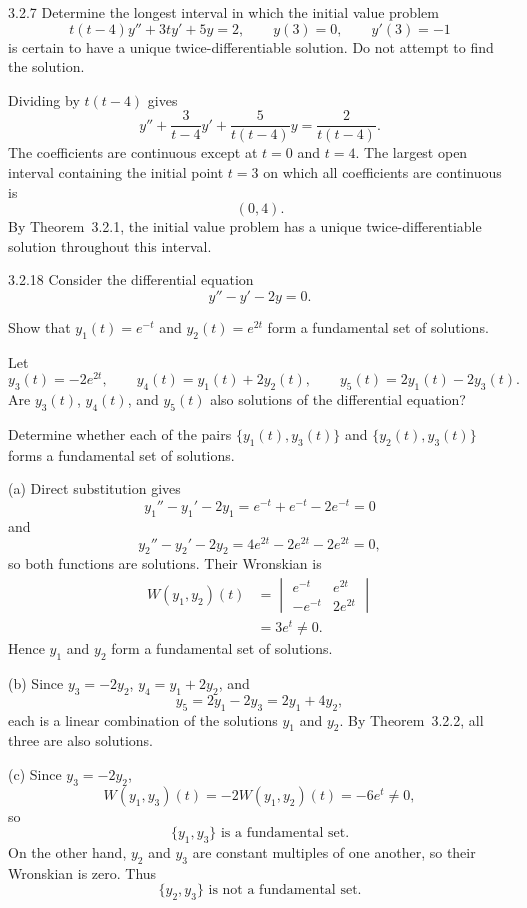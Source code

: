 \documentclass[11pt,oneside]{article}
\begin{document}
\begin{problem}{3.2.7}
Determine the longest interval in which the initial value problem
\[
    t(t-4)y''+3ty'+5y=2,
    \qquad
    y(3)=0,
    \qquad
    y'(3)=-1
\]
is certain to have a unique twice-differentiable solution. Do not attempt to find the solution.
\end{problem}

\begin{solution}
Dividing by $t(t-4)$ gives
\[
    y''+\frac{3}{t-4}y'
    +\frac{5}{t(t-4)}y
    =\frac{2}{t(t-4)}.
\]
The coefficients are continuous except at $t=0$ and $t=4$. The largest open interval containing the initial point $t=3$ on which all coefficients are continuous is
\[
    \boxed{(0,4)}.
\]
By Theorem~3.2.1, the initial value problem has a unique twice-differentiable solution throughout this interval.
\end{solution}

\begin{problem}{3.2.18}
Consider the differential equation
\[
    y''-y'-2y=0.
\]
\begin{problemsubparts}
    \item Show that $y_1(t)=e^{-t}$ and $y_2(t)=e^{2t}$ form a fundamental set of solutions.
    \item Let
    \[
        y_3(t)=-2e^{2t},
        \qquad
        y_4(t)=y_1(t)+2y_2(t),
        \qquad
        y_5(t)=2y_1(t)-2y_3(t).
    \]
    Are $y_3(t)$, $y_4(t)$, and $y_5(t)$ also solutions of the differential equation?
    \item Determine whether each of the pairs $\{y_1(t),y_3(t)\}$ and $\{y_2(t),y_3(t)\}$ forms a fundamental set of solutions.
\end{problemsubparts}
\end{problem}

\begin{solution}
\noindent\textup{(a)} Direct substitution gives
\[
    y_1''-y_1'-2y_1=e^{-t}+e^{-t}-2e^{-t}=0
\]
and
\[
    y_2''-y_2'-2y_2=4e^{2t}-2e^{2t}-2e^{2t}=0,
\]
so both functions are solutions. Their Wronskian is
\[
\begin{aligned}
    W(y_1,y_2)(t)
    &=
    \begin{vmatrix}
        e^{-t} & e^{2t}\\
        -e^{-t} & 2e^{2t}
    \end{vmatrix}\\
    &=3e^t\neq0.
\end{aligned}
\]
Hence $y_1$ and $y_2$ form a fundamental set of solutions.

\medskip
\noindent\textup{(b)} Since $y_3=-2y_2$, $y_4=y_1+2y_2$, and
\[
    y_5=2y_1-2y_3=2y_1+4y_2,
\]
each is a linear combination of the solutions $y_1$ and $y_2$. By Theorem~3.2.2, all three are also solutions.

\medskip
\noindent\textup{(c)} Since $y_3=-2y_2$,
\[
    W(y_1,y_3)(t)=-2W(y_1,y_2)(t)=-6e^t\neq0,
\]
so
\[
    \boxed{\{y_1,y_3\}\text{ is a fundamental set}}.
\]
On the other hand, $y_2$ and $y_3$ are constant multiples of one another, so their Wronskian is zero. Thus
\[
    \boxed{\{y_2,y_3\}\text{ is not a fundamental set}}.
\]
\end{solution}
\end{document}
